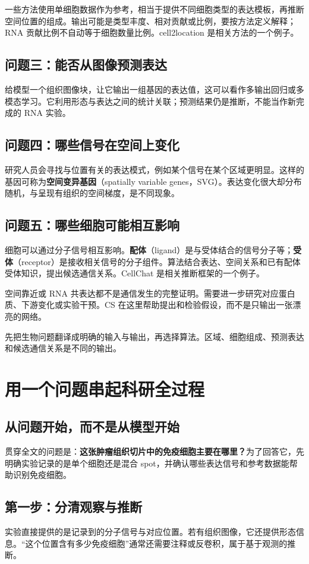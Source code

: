 \documentclass[UTF8,a4paper,11pt,fontset=fandol]{ctexart}
\newcommand{\term}[2]{{\color{accent}\textbf{#1}}（#2）}
\newcommand{\takeaway}[1]{\begin{tcolorbox}[learningstyle,title=本章要记住]#1\end{tcolorbox}}
\newcommand{\chapterstart}[1]{\clearpage\section{#1}}
\begin{document}
一些方法使用单细胞数据作为参考，相当于提供不同细胞类型的表达模板，再推断空间位置的组成。输出可能是类型丰度、相对贡献或比例，要按方法定义解释；RNA 贡献比例不自动等于细胞数量比例。cell2location 是相关方法的一个例子。\cite{cell2location}

\subsection{问题三：能否从图像预测表达}
给模型一个组织图像块，让它输出一组基因的表达值，这可以看作多输出回归或多模态学习。它利用形态与表达之间的统计关联；预测结果仍是推断，不能当作新完成的 RNA 实验。

\subsection{问题四：哪些信号在空间上变化}
研究人员会寻找与位置有关的表达模式，例如某个信号在某个区域更明显。这样的基因可称为\textbf{空间变异基因}（spatially variable genes，SVG）。表达变化很大却分布随机，与呈现有组织的空间梯度，是不同现象。

\subsection{问题五：哪些细胞可能相互影响}
细胞可以通过分子信号相互影响。\term{配体}{ligand}是与受体结合的信号分子等；\term{受体}{receptor}是接收相关信号的分子组件。算法结合表达、空间关系和已有配体受体知识，提出候选通信关系。CellChat 是相关推断框架的一个例子。\cite{cellchat}

空间靠近或 RNA 共表达都不是通信发生的完整证明。需要进一步研究对应蛋白质、下游变化或实验干预。CS 在这里帮助提出和检验假设，而不是只输出一张漂亮的网络。

\takeaway{先把生物问题翻译成明确的输入与输出，再选择算法。区域、细胞组成、预测表达和候选通信关系是不同的输出。}

\chapterstart{用一个问题串起科研全过程}
\enlargethispage{.8\baselineskip}
\subsection{从问题开始，而不是从模型开始}
贯穿全文的问题是：\textbf{这张肿瘤组织切片中的免疫细胞主要在哪里？}为了回答它，先明确实验记录的是单个细胞还是混合 spot，并确认哪些表达信号和参考数据能帮助识别免疫细胞。

\subsection{第一步：分清观察与推断}
实验直接提供的是记录到的分子信号与对应位置。若有组织图像，它还提供形态信息。“这个位置含有多少免疫细胞”通常还需要注释或反卷积，属于基于观测的推断。
\end{document}
